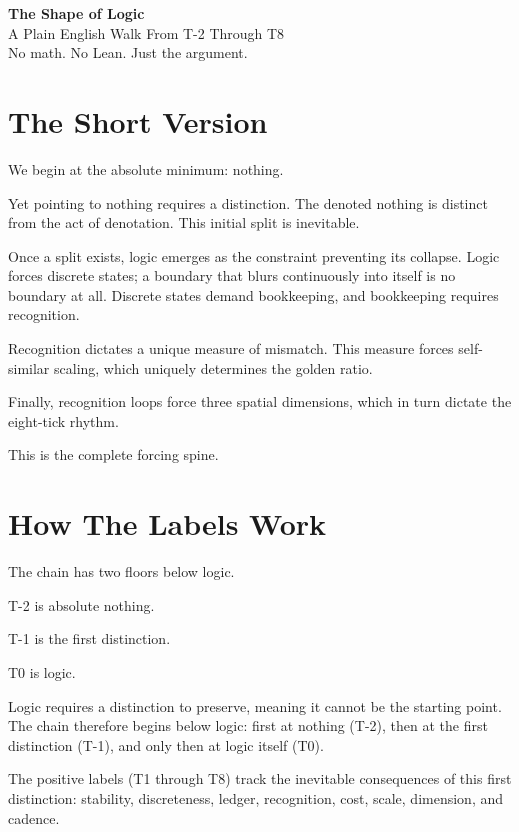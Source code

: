 \documentclass[11pt]{article}
\begin{document}
\begin{center}
{\Huge\bfseries The Shape of Logic}\\[0.4em]
{\Large A Plain English Walk From T-2 Through T8}\\[0.6em]
{\large No math. No Lean. Just the argument.}
\end{center}

\vspace{1em}

\section{The Short Version}

We begin at the absolute minimum: nothing.

Yet pointing to nothing requires a distinction. The denoted nothing is distinct from the act of denotation. This initial split is inevitable.

Once a split exists, logic emerges as the constraint preventing its collapse. Logic forces discrete states; a boundary that blurs continuously into itself is no boundary at all. Discrete states demand bookkeeping, and bookkeeping requires recognition.

Recognition dictates a unique measure of mismatch. This measure forces self-similar scaling, which uniquely determines the golden ratio.

Finally, recognition loops force three spatial dimensions, which in turn dictate the eight-tick rhythm.

This is the complete forcing spine.

\section{How The Labels Work}

The chain has two floors below logic.

T-2 is absolute nothing.

T-1 is the first distinction.

T0 is logic.

Logic requires a distinction to preserve, meaning it cannot be the starting point. The chain therefore begins below logic: first at nothing (T-2), then at the first distinction (T-1), and only then at logic itself (T0).

The positive labels (T1 through T8) track the inevitable consequences of this first distinction: stability, discreteness, ledger, recognition, cost, scale, dimension, and cadence.
\end{document}
